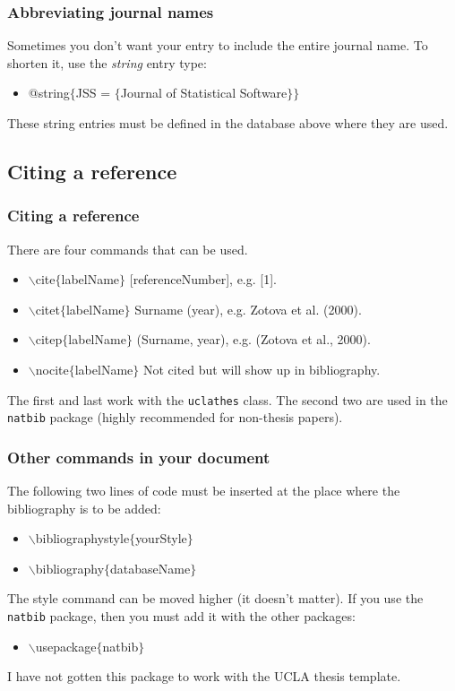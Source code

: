 \begin{frame}  \frametitle{Abbreviating journal names}
Sometimes you don't want your entry to include the entire journal name. To shorten it, use the \textit{string} entry type:
\begin{itemize}
\item[] @string$\{$JSS = $\{$Journal of Statistical Software$\}\}$
\end{itemize}
These string entries must be defined in the database above where they are used.
\end{frame}

\subsection{Citing a reference}

\begin{frame}  \frametitle{Citing a reference}
There are four commands that can be used.
\begin{itemize}
\item {\color{command}$\backslash$cite\color{braces}$\{${\color{black}labelName}$\}$} [referenceNumber], e.g. [1].
\item {\color{command}$\backslash$citet\color{braces}$\{${\color{black}labelName}$\}$} Surname (year), e.g. Zotova et al. (2000).
\item {\color{command}$\backslash$citep\color{braces}$\{${\color{black}labelName}$\}$} (Surname, year), e.g. (Zotova et al., 2000).
\item {\color{command}$\backslash$nocite\color{braces}$\{${\color{black}labelName}$\}$} Not cited but will show up in bibliography.
\end{itemize}
The first and last work with the \texttt{\color{highlight}uclathes} class. The second two are used in the \texttt{\color{highlight}natbib} package (highly recommended for non-thesis papers).
\end{frame}

\begin{frame}  \frametitle{Other commands in your document}
The following two lines of code must be inserted at the place where the bibliography is to be added:
\begin{itemize}
\item[] {\color{command}$\backslash$bibliographystyle\color{braces}$\{${\color{black}yourStyle}$\}$}
\item[] {\color{command}$\backslash$bibliography\color{braces}$\{${\color{black}databaseName}$\}$}
\end{itemize}
The style command can be moved higher (it doesn't matter). If you use the \texttt{\color{highlight}natbib} package, then you must add it with the other packages:
\begin{itemize}
\item[] {\color{command}$\backslash$usepackage\color{braces}$\{${\color{black}natbib}$\}$}
\end{itemize}
I have not gotten this package to work with the UCLA thesis template.
\end{frame}

